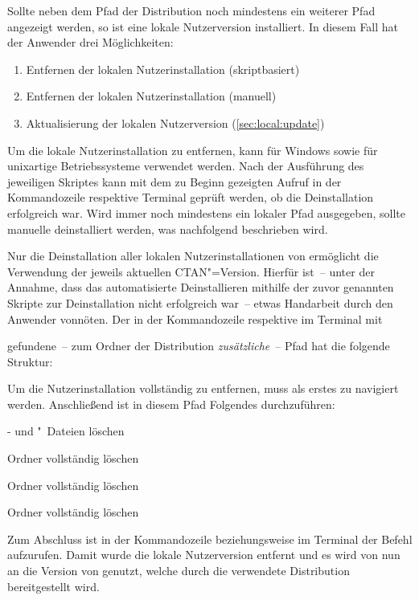 Sollte neben dem Pfad der Distribution noch mindestens ein weiterer Pfad 
angezeigt werden, so ist eine lokale Nutzerversion installiert. In 
diesem Fall hat der Anwender drei Möglichkeiten:
%
\begin{enumerate}
\item Entfernen der lokalen Nutzerinstallation (skriptbasiert)
\item Entfernen der lokalen Nutzerinstallation (manuell)
\item Aktualisierung der lokalen Nutzerversion (\autoref{sec:local:update})
\end{enumerate}
%
Um die lokale Nutzerinstallation zu entfernen, kann für Windows
sowie für unixartige Betriebssysteme
verwendet werden. Nach der Ausführung des jeweiligen Skriptes kann mit dem zu 
Beginn gezeigten Aufruf in der Kommandozeile respektive Terminal geprüft 
werden, ob die Deinstallation erfolgreich war. Wird immer noch mindestens ein 
lokaler Pfad ausgegeben, sollte \TUDScript manuelle deinstalliert werden, was 
nachfolgend beschrieben wird.

Nur die Deinstallation aller lokalen Nutzerinstallationen von \TUDScript 
ermöglicht die Verwendung der jeweils aktuellen CTAN"=Version. Hierfür ist~-- 
unter der Annahme, dass das automatisierte Deinstallieren mithilfe der zuvor 
genannten Skripte zur Deinstallation nicht erfolgreich war~-- etwas Handarbeit 
durch den Anwender vonnöten. Der in der Kommandozeile respektive im Terminal mit
%
\begin{quoting}
\end{quoting}
%
gefundene~-- zum Ordner der Distribution \emph{zusätzliche}~-- Pfad hat die 
folgende Struktur:
%
\begin{quoting}
\end{quoting}
%
Um die Nutzerinstallation vollständig zu entfernen, muss als erstes zu 
 navigiert werden. Anschließend ist in diesem 
Pfad Folgendes durchzuführen:
%
\settowidth{}%
\begin{description}[labelwidth=\tempdim,labelsep=1em]
\item[\Path{tex/latex/tudscr/}]- und "~Dateien löschen
\item[\Path{tex/latex/tudscr/}]Ordner  vollständig löschen
\item[\Path{doc/latex/}] Ordner  vollständig löschen
\item[\Path{source/latex/}] Ordner  vollständig löschen
\end{description}
%
Zum Abschluss ist in der Kommandozeile beziehungsweise im Terminal der Befehl 
 aufzurufen. Damit wurde die lokale Nutzerversion entfernt und es 
wird von nun an die Version von \TUDScript genutzt, welche durch die verwendete 
Distribution bereitgestellt wird.




